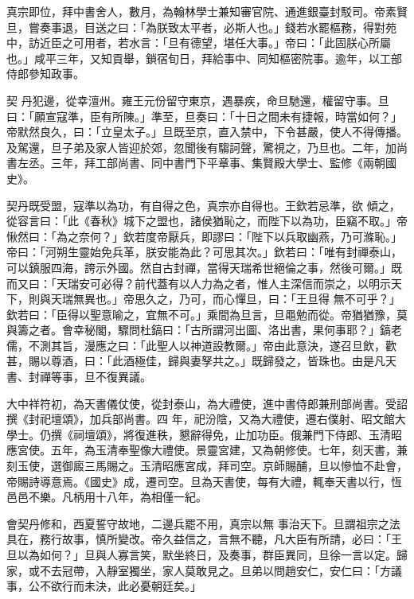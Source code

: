 \begin{pinyinscope}
 真宗即位，拜中書舍人，數月，為翰林學士兼知審官院、通進銀臺封駁司。帝素賢旦，嘗奏事退，目送之曰：「為朕致太平者，必斯人也。」錢若水罷樞務，得對苑中，訪近臣之可用者，若水言：「旦有德望，堪任大事。」帝曰：「此固朕心所屬也。」咸平三年，又知貢舉，鎖宿旬日，拜給事中、同知樞密院事。逾年，以工部侍郎參知政事。



 契
 丹犯邊，從幸澶州。雍王元份留守東京，遇暴疾，命旦馳還，權留守事。旦曰：「願宣寇準，臣有所陳。」準至，旦奏曰：「十日之間未有捷報，時當如何？」帝默然良久，曰：「立皇太子。」旦既至京，直入禁中，下令甚嚴，使人不得傳播。及駕還，旦子弟及家人皆迎於郊，忽聞後有騶訶聲，驚視之，乃旦也。二年，加尚書左丞。三年，拜工部尚書、同中書門下平章事、集賢殿大學士、監修《兩朝國史》。



 契丹既受盟，寇準以為功，有自得之色，真宗亦自得也。王欽若忌準，欲
 傾之，從容言曰：「此《春秋》城下之盟也，諸侯猶恥之，而陛下以為功，臣竊不取。」帝愀然曰：「為之奈何？」欽若度帝厭兵，即謬曰：「陛下以兵取幽燕，乃可滌恥。」帝曰：「河朔生靈始免兵革，朕安能為此？可思其次。」欽若曰：「唯有封禪泰山，可以鎮服四海，誇示外國。然自古封禪，當得天瑞希世絕倫之事，然後可爾。」既而又曰：「天瑞安可必得？前代蓋有以人力為之者，惟人主深信而崇之，以明示天下，則與天瑞無異也。」帝思久之，乃可，而心憚旦，曰：「王旦得
 無不可乎？」欽若曰：「臣得以聖意喻之，宜無不可。」乘間為旦言，旦黽勉而從。帝猶猶豫，莫與籌之者。會幸秘閣，驟問杜鎬曰：「古所謂河出圖、洛出書，果何事耶？」鎬老儒，不測其旨，漫應之曰：「此聖人以神道設教爾。」帝由此意決，遂召旦飲，歡甚，賜以尊酒，曰：「此酒極佳，歸與妻孥共之。」既歸發之，皆珠也。由是凡天書、封禪等事，旦不復異議。



 大中祥符初，為天書儀仗使，從封泰山，為大禮使，進中書侍郎兼刑部尚書。受詔撰《封祀壇頌》，加兵部尚書。四
 年，祀汾陰，又為大禮使，遷右僕射、昭文館大學士。仍撰《祠壇頌》，將復進秩，懇辭得免，止加功臣。俄兼門下侍郎、玉清昭應宮使。五年，為玉清奉聖像大禮使。景靈宮建，又為朝修使。七年，刻天書，兼刻玉使，選御廄三馬賜之。玉清昭應宮成，拜司空。京師賜酺，旦以慘恤不赴會，帝賜詩導意焉。《國史》成，遷司空。旦為天書使，每有大禮，輒奉天書以行，恆邑邑不樂。凡柄用十八年，為相僅一紀。



 會契丹修和，西夏誓守故地，二邊兵罷不用，真宗以無
 事治天下。旦謂祖宗之法具在，務行故事，慎所變改。帝久益信之，言無不聽，凡大臣有所請，必曰：「王旦以為如何？」旦與人寡言笑，默坐終日，及奏事，群臣異同，旦徐一言以定。歸家，或不去冠帶，入靜室獨坐，家人莫敢見之。旦弟以問趙安仁，安仁曰：「方議事，公不欲行而未決，此必憂朝廷矣。」




\end{pinyinscope}
